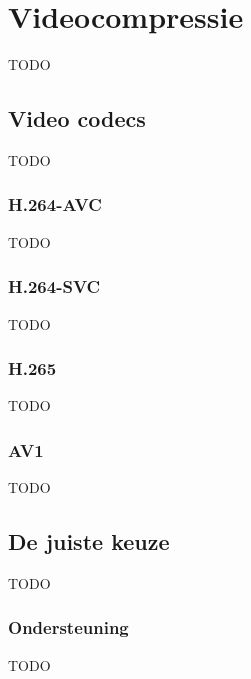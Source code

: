 \chapter{Videocompressie}
\label{ch:videocompressie}

TODO

\section{Video codecs}
\label{sec:videocompressie-video-codecs}

TODO

\subsection{H.264-AVC}
\label{sec:videocompressie-h264-AVC}

TODO

\subsection{H.264-SVC}
\label{sec:videocompressie-h264-SVC}

TODO

\subsection{H.265}
\label{sec:videocompressie-h265}

TODO

\subsection{AV1}
\label{sec:videocompressie-av1}

TODO

\section{De juiste keuze}
\label{sec:videocompressie-keuze}

TODO

\subsection{Ondersteuning}
\label{sec:videocompressie-ondersteuning}

TODO
